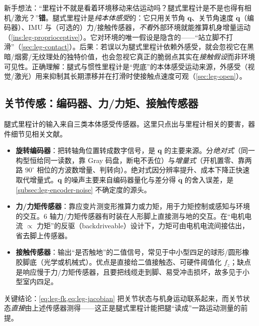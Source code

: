 \begin{pitfall}
新手想法：“里程计不就是看着环境移动来估运动吗？腿式里程计是不是也得有相机/激光？”\textbf{错}。腿式里程计是\emph{纯本体感受}的：它只用关节角 $\mathbf{q}$、关节角速度 $\dot{\mathbf{q}}$（编码器）、IMU 与（可选的）力/接触传感器，\emph{不看}外部环境就能推算机身增量运动（\cref{ins:leg-proprioceptive}）。它对环境的唯一假设是隐含的——“站立脚不打滑”（\cref{sec:leg-contact}）。后果：若误以为腿式里程计依赖外感受，就会忽视它在黑暗/烟雾/无纹理处的独特价值，也会忽视它真正的脆弱点其实在\emph{接触假设}而非环境可见性。正确理解：腿式与惯性里程计是“兜底”的本体感受运动来源，外感受（视觉/激光）用来抑制其长期漂移并在打滑时使接触点速度可观（\cref{sec:leg-open}）。
\end{pitfall}

\subsection{关节传感：编码器、力/力矩、接触传感器}
\label{subsec:leg-sensing}

腿式里程计的输入来自三类本体感受传感器。这里只点出与里程计相关的要害，器件细节见相关文献\cite{carlone2026handbook}。
\begin{itemize}
  \item \textbf{旋转编码器}：把转轴角位置转成数字信号，是 $\mathbf{q}$ 的主要来源。分\emph{绝对式}（同一构型恒给同一读数，靠 Gray 码盘，断电不丢位）与\emph{增量式}（开机置零、靠两路 $90^\circ$ 相位的方波数增量、判转向）。绝对式因分辨率提升、成本下降正快速取代增量式。$\mathbf{q}$ 的噪声主要来自编码器量化与差分得 $\dot{\mathbf{q}}$ 的舍入误差，是 \cref{subsec:leg-encoder-noise} 不确定度的源头。
  \item \textbf{力/力矩传感器}：靠应变片测变形推算力或力矩，用于力矩控制或感知与环境的交互。$6$ 轴力/力矩传感器有时装在人形脚上直接测与地的交互。在“电机电流 $\propto$ 力矩”的反驱（backdriveable）设计下\cite{carlone2026handbook}，力矩可由电机电流间接估出，省去脚上传感器。
  \item \textbf{接触传感器}：输出“是否触地”的二值信号，常见于中小型四足的球形/圆形橡胶脚底（光学或机械式）。优点是直接给二值接触态、可硬件阈值化 $f_z$；缺点是响应慢于力/力矩传感器，且要把线缆走到脚、易受冲击损坏，故多见于小型室内四足。
\end{itemize}
关键结论：\cref{eq:leg-fk,eq:leg-jacobian} 把关节状态与机身运动联系起来，而关节状态\emph{直接}由上述传感器测得——这正是腿式里程计能把腿“读成”一路运动测量的前提。

